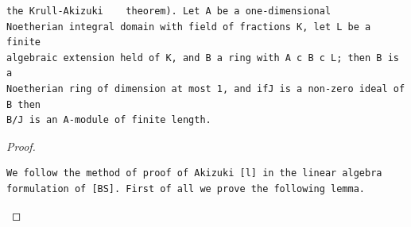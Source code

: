 \begin{theorem}\label{mcrt-auto-theorem-11-7}\uses{}
\begin{verbatim}
the Krull-Akizuki    theorem). Let A be a one-dimensional
Noetherian integral domain with field of fractions K, let L be a finite
algebraic extension held of K, and B a ring with A c B c L; then B is a
Noetherian ring of dimension at most 1, and ifJ is a non-zero ideal of B then
B/J is an A-module of finite length.
\end{verbatim}
\end{theorem}
\begin{proof}
\begin{verbatim}
We follow the method of proof of Akizuki [l] in the linear algebra
formulation of [BS]. First of all we prove the following lemma.
\end{verbatim}
\end{proof}


